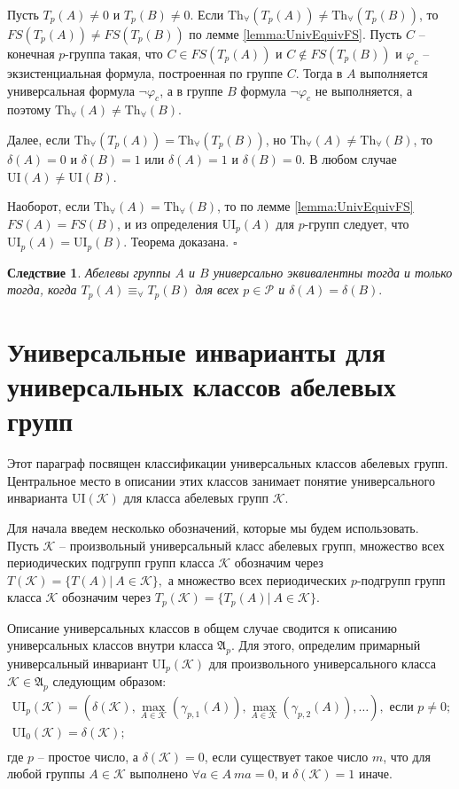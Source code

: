 \documentclass[a4paper,11pt,twoside]{article}
\newtheorem{corollary}{Следствие}[section]
\def\A{{\mathfrak{A}}}
\def\K{{\mathcal{K}}}
\def\P{{\mathcal{P}}}
\def\Tha{{\mathrm{Th}_\forall}}
\def\ui{{\mathrm{UI}}}
\begin{document}
Пусть $T_p(A) \neq 0$ и $T_p(B) \neq 0$. Если $\Tha(T_p(A)) \neq \Tha(T_p(B))$, то $FS(T_p(A)) \neq FS(T_p(B))$ по лемме \ref{lemma:UnivEquivFS}. Пусть $C$ -- конечная $p$-группа такая, что $C \in FS(T_p(A))$ и $C \notin FS(T_p(B))$ и $\varphi_c$ -- экзистенциальная формула, построенная по группе $C$. Тогда в $A$ выполняется универсальная формула $\neg \varphi_c$, а в группе $B$ формула $\neg \varphi_c$ не выполняется, а поэтому $\Tha(A) \neq \Tha(B)$.

Далее, если $\Tha(T_p(A)) = \Tha(T_p(B))$, но $\Tha(A) \neq \Tha(B)$, то $\delta(A) = 0$ и $\delta(B) = 1$ или $\delta(A) = 1$ и $\delta(B) = 0$. В любом случае $\ui(A) \neq \ui(B)$. 

Наоборот, если $\Tha(A) = \Tha(B)$, то по лемме \ref{lemma:UnivEquivFS} $FS(A) = FS(B)$, и из определения $\ui_p(A)$ для $p$-групп следует, что $\ui_p(A) = \ui_p(B)$. Теорема доказана. $\square$

\begin{corollary}\label{cor:UnivEquivTpA_TpB}
Абелевы группы $A$ и $B$ универсально эквивалентны тогда и только тогда, когда $T_p(A) \equiv_\forall T_p(B)$ для всех $p \in \P$ и $\delta(A) = \delta(B).$
\end{corollary}







\section{Универсальные инварианты для универсальных классов абелевых групп}

Этот параграф посвящен классификации универсальных классов абелевых групп. Центральное место в описании этих классов занимает понятие универсального инварианта $\ui(\K)$ для класса абелевых групп $\K$. 

Для начала введем несколько обозначений, которые мы будем использовать. Пусть $\K$ -- произвольный универсальный класс абелевых групп, множество всех периодических подгрупп групп класса $\K$ обозначим через $T(\K) = \{ T(A) | \ A \in \K\},$ а множество всех периодических $p$-подгрупп групп класса $\K$ обозначим через $T_p(\K) = \{ T_p(A) | \ A \in \K\}.$

Описание универсальных классов в общем случае сводится к описанию универсальных классов внутри класса $\A_p$. Для этого, определим примарный универсальный инвариант $\ui_p(\K)$ для произвольного универсального класса $\K \in \A_p$ следующим образом:
$$\begin{array}{c}
\ui_p(\K) = (\delta(\K),  \max\limits_{A \in \K}(\gamma_{p,1}(A)), \max\limits_{A \in \K}(\gamma_{p,2}(A)), \ldots), \text{ если } p \neq 0; \\
\ui_0(\K) = \delta(\K); \\
\end{array}$$
где $p$ -- простое число, а $\delta(\K) = 0$, если существует такое число $m$, что для любой группы $A \in \K$ выполнено $\forall a \in A \ ma=0$, и $\delta(\K) = 1$ иначе.
\end{document}
